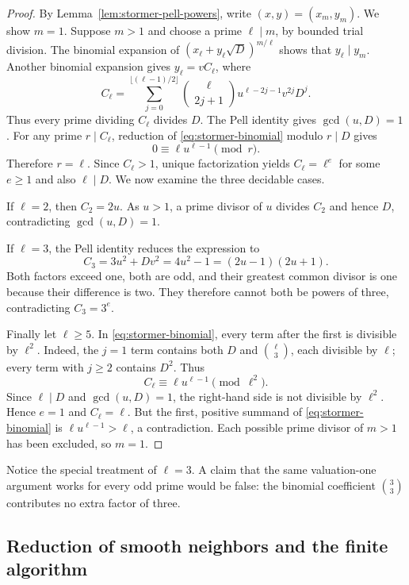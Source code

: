 \begin{proof}
By Lemma~\ref{lem:stormer-pell-powers}, write $(x,y)=(x_m,y_m)$.
We show $m=1$.  Suppose $m>1$ and choose a prime $\ell\mid m$, by bounded
trial division.  The binomial expansion of
$(x_\ell+y_\ell\sqrt D)^{m/\ell}$ shows that $y_\ell\mid y_m$.
Another binomial expansion gives $y_\ell=vC_\ell$, where
\begin{equation}\label{eq:stormer-binomial}
 C_\ell=\sum_{j=0}^{\lfloor(\ell-1)/2\rfloor}
  {\ell\choose 2j+1}u^{\ell-2j-1}v^{2j}D^j.
\end{equation}
Thus every prime dividing $C_\ell$ divides $D$.
The Pell identity gives $\gcd(u,D)=1$.
For any prime $r\mid C_\ell$, reduction of
\eqref{eq:stormer-binomial} modulo $r\mid D$ gives
\[
                   0\equiv\ell u^{\ell-1}\pmod r.
\]
Therefore $r=\ell$.  Since $C_\ell>1$, unique factorization yields
$C_\ell=\ell^e$ for some $e\ge1$ and also $\ell\mid D$.
We now examine the three decidable cases.

If $\ell=2$, then $C_2=2u$.  As $u>1$, a prime divisor of $u$ divides $C_2$
and hence $D$, contradicting $\gcd(u,D)=1$.

If $\ell=3$, the Pell identity reduces the expression to
\[
 C_3=3u^2+Dv^2=4u^2-1=(2u-1)(2u+1).
\]
Both factors exceed one, both are odd, and their greatest common divisor is one
because their difference is two.  They therefore cannot both be powers of
three, contradicting $C_3=3^e$.

Finally let $\ell\ge5$.  In \eqref{eq:stormer-binomial}, every term after the
first is divisible by $\ell^2$.  Indeed, the $j=1$ term contains both $D$ and
${\ell\choose3}$, each divisible by $\ell$; every term with $j\ge2$ contains
$D^2$.  Thus
\[
              C_\ell\equiv\ell u^{\ell-1}\pmod{\ell^2}.
\]
Since $\ell\mid D$ and $\gcd(u,D)=1$, the right-hand side is not divisible
by $\ell^2$.  Hence $e=1$ and $C_\ell=\ell$.
But the first, positive summand of \eqref{eq:stormer-binomial} is
$\ell u^{\ell-1}>\ell$, a contradiction.  Each possible prime divisor of
$m>1$ has been excluded, so $m=1$.
\end{proof}

Notice the special treatment of $\ell=3$.  A claim that the same valuation-one
argument works for every odd prime would be false: the binomial coefficient
${3\choose3}$ contributes no extra factor of three.

\subsection{Reduction of smooth neighbors and the finite algorithm}


